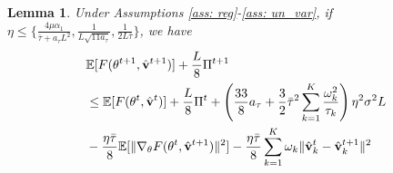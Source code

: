 \documentclass[twoside,journal]{IEEEtran}
\def\VectorFont{\bf}
\newcommand{\vv}{{\VectorFont v}}
\newtheorem{lemma}{Lemma}
\begin{document}
\begin{lemma}\label{lem: decsent}
	Under Assumptions \ref{ass: reg}-\ref{ass: un_var}, if  $\eta\leq \{\frac{4\mu\alpha_1}{\bar{\tau}+a_{\tau}L^2},\frac{1}{L\sqrt{11 a_{\tau}}},\frac{1}{2L\bar{\tau}}\}$, we have
\begin{align}\label{eqn: decsent}
\nonumber&\mathbb{E}[F(\theta^{t+1},\hat{\vv}^{t+1})]+\frac{L}{8}\Pi^{t+1}\\
\nonumber&\leq \mathbb{E}[F(\theta^{t},\hat{\vv}^t)]+\frac{L}{8}\Pi^{t}
+\left(\frac{33}{8}a_{\tau}
+\frac{3}{2}\bar{\tau}^2\sum_{k=1}^K\frac{\omega_k^2}{\tau_k}\right)\eta^2\sigma^2L
\\
&-\frac{\eta\bar{\tau}}{8}\mathbb{E}[\|\nabla_{\theta}F(\theta^t,\hat{\vv}^{t+1})\|^2]
-\frac{\eta\bar{\tau}}{8}\sum_{k=1}^K\omega_k\|
\hat{\vv}_{k}^{t}-\hat{\vv}_{k}^{t+1}\|^2
\end{align}
\end{lemma}
\end{document}
